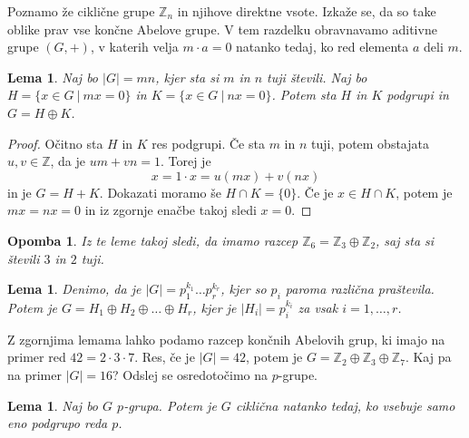 \documentclass[10pt, a4paper]{article}
\newtheorem*{opomba}{Opomba}
\newtheorem{lema}[izr]{Lema}
\newenvironment{noticeC}{%
  \tcolorbox[%
  notitle,
  empty,
  enhanced,  %
  breakable,
  coltext=black, 
  fontupper=\rmfamily,
  noparskip,
  sharp corners,
  boxrule=-1pt,  %
  frame hidden,
  left=7pt,  %
  right=7pt,
  top=5pt,
  bottom=5pt,
  before skip=2.5ex plus 2pt,
  after skip=2.5ex plus 2pt,
  overlay unbroken and last={%
  },
  ]}
{\endtcolorbox}
\newenvironment{dokaz}%
  {\begin{noticeC}\begin{proof}}%
  {\end{proof}\end{noticeC}}
\newcommand{\Z}{\mathbb {Z}}
\begin{document}
Poznamo že ciklične grupe $\Z_n$ in njihove direktne vsote.
Izkaže se, da so take oblike prav vse končne Abelove grupe.
V tem razdelku obravnavamo aditivne grupe $(G, +)$, 
v katerih velja $m \cdot a = 0$ natanko tedaj, ko red elementa $a$ deli $m$.

\begin{lema}
  Naj bo $|G| = mn$, kjer sta si $m$ in $n$ tuji števili.
  Naj bo $H = \{x \in G\ |\ mx = 0\}$ in $K = \{x \in G\ |\ nx = 0\}$.
  Potem sta $H$ in $K$ podgrupi in $G = H \oplus K$. 
\end{lema}

\begin{dokaz}
  Očitno sta $H$ in $K$ res podgrupi.
  Če sta $m$ in $n$ tuji, potem obstajata $u, v \in \Z$,
  da je $um + vn = 1$. Torej je 
  $$x = 1 \cdot x = u(mx) + v(nx)$$ in je $G = H + K$.
  Dokazati moramo še $H \cap K = \{0\}$.
  Če je $x \in H \cap K$, potem je $mx = nx = 0$ in iz zgornje enačbe takoj sledi $x = 0$.
\end{dokaz}

\begin{opomba}
  Iz te leme takoj sledi, da imamo razcep $\Z_6 = \Z_3 \oplus \Z_2$,
  saj sta si števili $3$ in $2$ tuji.
\end{opomba}

\begin{lema}
  Denimo, da je $|G| = p_1^{k_1} \dots p_r^{k_r}$, kjer so $p_i$ paroma različna praštevila.
  Potem je $G = H_1 \oplus H_2 \oplus \dots \oplus H_r$, kjer je $|H_i| = p_i^{k_i}$
  za vsak $i = 1, \dots, r$.
\end{lema}

Z zgornjima lemama lahko podamo razcep končnih Abelovih grup, ki imajo na primer 
red $42 = 2 \cdot 3 \cdot 7$. Res, če je $|G| = 42$, potem je $G = \Z_2 \oplus \Z_3 \oplus \Z_7$.
Kaj pa na primer $|G| = 16$? Odslej se osredotočimo na $p$-grupe.

\begin{lema}
  Naj bo $G$ $p$-grupa. Potem je $G$ ciklična natanko tedaj, ko vsebuje samo eno 
  podgrupo reda $p$.
\end{lema}
\end{document}
